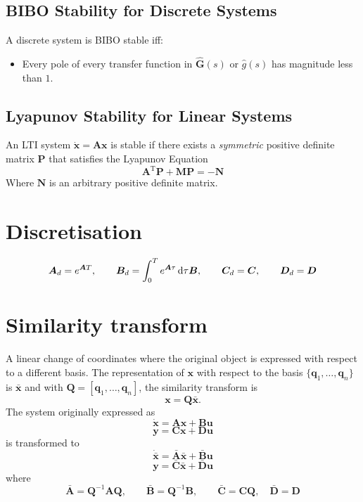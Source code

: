 \documentclass[a4paper]{article}
\newcommand{\M}[1]{\bm{#1}}
\newcommand{\V}[1]{\mathbf{#1}}
\newcommand{\transpose}{^{\text{T}}}
\begin{document}
\subsection{BIBO Stability for Discrete Systems}
A discrete system is BIBO stable iff:
\begin{itemize}
\item	Every pole of every transfer function in $\M{\hat{G}}(s)$ or $\hat{g}(s)$ has magnitude less than $1$.
\end{itemize}
\subsection{Lyapunov Stability for Linear Systems}
An LTI system $\V{\dot{x}} = \M{A}\V{x}$ is stable if there exists a \emph{symmetric} positive definite matrix $\M{P}$ that satisfies the Lyapunov Equation
$$\M{A} \transpose \M{P} + \M{MP} = - \M{N}$$
Where $\M{N}$ is an arbitrary positive definite matrix.



\section{Discretisation}
$$\M{A}_d = e^{\M{A}T},\qquad \M{B}_d = \int_0^T e^{\M{A}\tau} \dif \tau \M{B}, \qquad \M{C}_d = \M{C}, \qquad \M{D}_d = \M{D}$$



\section{Similarity transform}
A linear change of coordinates where the original object is expressed with respect to a different basis. The representation of $\V{x}$ with respect to the basis $\{ \V{q}_1, \dots, \V{q}_n \}$ is $\V{\bar{x}}$ and with $\M{Q} = [ \V{q}_1, \dots, \V{q}_n ]$, the similarity transform is
$$\V{x} = \M{Q}\V{\bar{x}}.$$
The system originally expressed as
$$\V{\dot{x}} = \M{A}\V{x} + \M{B}\V{u}$$
$$\V{y} = \M{C}\V{x} + \M{D}\V{u}$$
is transformed to
$$\V{\dot{\bar{x}}} = \M{\bar{A}}\V{\bar{x}} + \M{\bar{B}}\V{u}$$
$$\V{y} = \M{\bar{C}}\V{\bar{x}} + \M{\bar{D}}\V{u}$$
where
$$\M{\bar{A}} = \M{Q}^{-1}\M{AQ},\qquad \M{\bar{B}} = \M{Q}^{-1}\M{B},\qquad \M{\bar{C}} = \M{CQ},\quad \M{\bar{D}} = \M{D}$$
\end{document}

